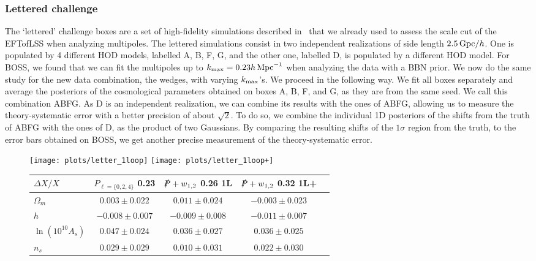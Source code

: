 \documentclass[12pt,a4paper]{article}
\def\hinvMpc{h\,{\rm Mpc}^{-1}}
\def\PA{\slashed{P}}
\renewcommand{\(}{\left(}
\renewcommand{\)}{\right)}
\begin{document}
{\subsubsection{Lettered challenge}
The `lettered' challenge boxes are a set of high-fidelity simulations described in~\cite{DAmico:2019fhj} that we already used to assess the scale cut of the EFTofLSS when analyzing multipoles. 
The lettered simulations consist in two independent realizations of side length $2.5 \, {\rm Gpc}/h$. 
One is populated by 4 different HOD models, labelled A, B, F, G, and the other one, labelled D, is populated by a different HOD model. 
For BOSS, we found that we can fit the multipoles up to $k_{\rm max} = 0.23 \hinvMpc$ when analyzing the data with a BBN prior. 
We now do the same study for the new data combination, the wedges, with varying $k_{\rm max}$'s. 
{We proceed in the following way}. 
We fit all boxes separately and average the posteriors of the cosmological parameters obtained on boxes A, B, F, and G, as they are from the same seed. 
We call this combination ABFG. 
As D is an independent realization, we can combine its results with the ones of ABFG, allowing us to measure the theory-systematic error with a better precision of about $\sqrt{2}$. 
To do so, we combine the individual 1D posteriors of the shifts from the truth of ABFG with the ones of D, as the product of two Gaussians. 
By comparing the resulting shifts of the $1\sigma$ region from the truth, to the error bars obtained on BOSS, we get another precise measurement of the theory-systematic error. 

\begin{figure}[ht!]
\centering
\texttt{[image: plots/letter\_1loop]}
\texttt{[image: plots/letter\_1loop+]}\\ \vspace{0.3em}

\scriptsize
    \begin{tabular}{|l|c|c|c|c|}
     \hline 
    $\Delta X / X$ & $P_{\ell=\{0,2,4\}}$ 0.23 			& $\PA +  w_{1,2}$ 0.26 1L 		&  $\PA +  w_{1,2}$ 0.32 1L+ \\ \hline 
    $\Omega_{m }$ & $0.003\pm 0.022$ 	& $0.011\pm 0.024$ 			& $-0.003\pm 0.023$ \\ 
    $ h$ & $-0.008\pm 0.007$  			& $-0.009\pm 0.008$ 			& $-0.011\pm 0.007$ \\ 
    $\ln (10^{10}A_s)$ & $0.047\pm 0.024$  	& $0.036\pm 0.027$ 			& $0.036\pm 0.025$ \\ 
    $ n_s$ & $0.029\pm 0.029$				& $0.010\pm 0.031$			& $0.022\pm 0.030$ \\
    \hline 
    \end{tabular}


\end{figure}}
\end{document}
